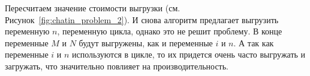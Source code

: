 Пересчитаем значение стоимости выгрузки (см. Рисунок~\ref{fig:chatin_problem_2}). И снова алгоритм предлагает
выгрузить переменную $n$, переменную цикла, однако это не решит проблему.
В конце переменные $M$ и $N$ будут выгружены, как и переменные $i$ и $n$.
А так как переменные $i$ и $n$ используются в цикле, то их придется очень часто выгружать и загружать, что
значительно повлияет на производительность.
